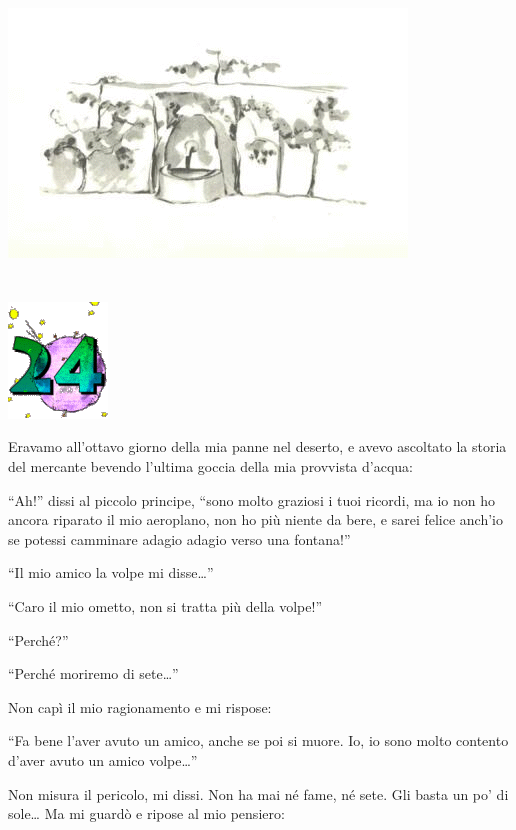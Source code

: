 \documentclass[11pt]{scrbook}
\begin{document}
\begin{center}
\includegraphics{img/studanka}
\end{center}

\chapter{}
\begin{center}
\includegraphics{img/chapter24}
\end{center}

Eravamo all'ottavo giorno della mia panne nel deserto, e avevo ascoltato la storia del mercante bevendo l'ultima goccia della mia provvista d'acqua:

``Ah!'' dissi al piccolo principe, ``sono molto graziosi i tuoi ricordi, ma io non ho ancora riparato il mio aeroplano, non ho più niente da bere, e sarei felice anch'io se potessi camminare adagio adagio verso una fontana!''

``Il mio amico la volpe mi disse\ldots{}''

``Caro il mio ometto, non si tratta più della volpe!''

``Perché?''

``Perché moriremo di sete\ldots{}''

Non capì il mio ragionamento e mi rispose:

``Fa bene l'aver avuto un amico, anche se poi si muore. Io, io sono molto contento d'aver avuto un amico volpe\ldots{}''

Non misura il pericolo, mi dissi. Non ha mai né fame, né sete. Gli basta un po' di sole\ldots{} Ma mi guardò e ripose al mio pensiero:
\end{document}
